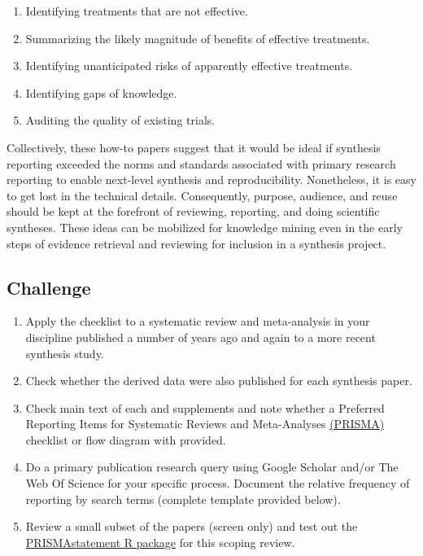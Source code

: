 \documentclass[
]{book}
\providecommand{\tightlist}{%
  \setlength{\itemsep}{0pt}\setlength{\parskip}{0pt}}
\begin{document}
\begin{enumerate}
\def\labelenumi{\arabic{enumi}.}
\tightlist
\item
  Identifying treatments that are not effective.\\
\item
  Summarizing the likely magnitude of benefits of effective treatments.\\
\item
  Identifying unanticipated risks of apparently effective treatments.\\
\item
  Identifying gaps of knowledge.\\
\item
  Auditing the quality of existing trials.
\end{enumerate}

Collectively, these how-to papers suggest that it would be ideal if synthesis reporting exceeded the norms and standards associated with primary research reporting to enable next-level synthesis and reproducibility. Nonetheless, it is easy to get lost in the technical details. Consequently, purpose, audience, and reuse should be kept at the forefront of reviewing, reporting, and doing scientific syntheses. These ideas can be mobilized for knowledge mining even in the early steps of evidence retrieval and reviewing for inclusion in a synthesis project.

\hypertarget{challenge-1}{%
\subsection*{Challenge}\label{challenge-1}}

\begin{enumerate}
\def\labelenumi{\arabic{enumi}.}
\tightlist
\item
  Apply the checklist to a systematic review and meta-analysis in your discipline published a number of years ago and again to a more recent synthesis study.\\
\item
  Check whether the derived data were also published for each synthesis paper.\\
\item
  Check main text of each and supplements and note whether a Preferred Reporting Items for Systematic Reviews and Meta-Analyses \href{http://www.prisma-statement.org}{(PRISMA)} checklist or flow diagram with provided.\\
\item
  Do a primary publication research query using Google Scholar and/or The Web Of Science for your specific process. Document the relative frequency of reporting by search terms (complete template provided below).\\
\item
  Review a small subset of the papers (screen only) and test out the \href{https://cran.r-project.org/web/packages/PRISMAstatement/index.html}{PRISMAstatement R package} for this scoping review.
\end{enumerate}
\end{document}
